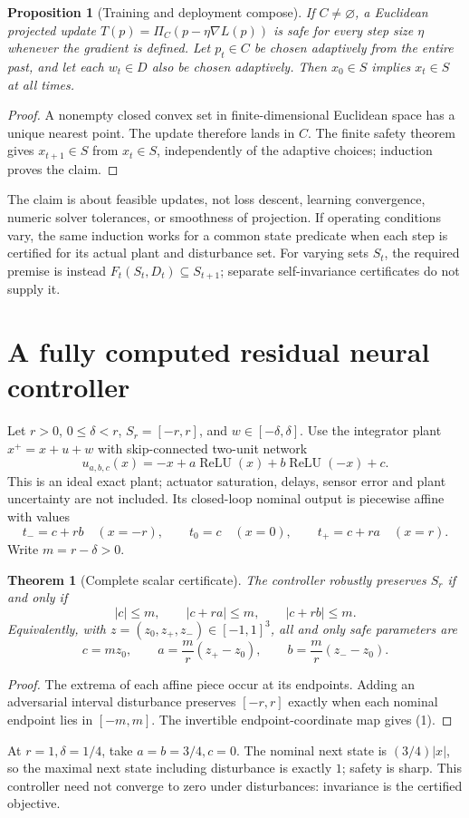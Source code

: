 \documentclass[11pt]{article}
\newtheorem{theorem}{Theorem}\newtheorem{proposition}{Proposition}
\begin{document}
\begin{proposition}[Training and deployment compose]
If $C\ne\varnothing$, a Euclidean projected update
$T(p)=\Pi_C(p-\eta\nabla L(p))$ is safe for every step size $\eta$ whenever the gradient is defined. Let $p_t\in C$ be chosen adaptively from the entire past, and let each $w_t\in D$ also be chosen adaptively. Then $x_0\in S$ implies $x_t\in S$ at all times.
\end{proposition}
\begin{proof}
A nonempty closed convex set in finite-dimensional Euclidean space has a unique nearest point. The update therefore lands in $C$. The finite safety theorem gives $x_{t+1}\in S$ from $x_t\in S$, independently of the adaptive choices; induction proves the claim.
\end{proof}
The claim is about feasible updates, not loss descent, learning convergence, numeric solver tolerances, or smoothness of projection. If operating conditions vary, the same induction works for a common state predicate when each step is certified for its actual plant and disturbance set. For varying sets $S_t$, the required premise is instead $F_t(S_t,D_t)\subseteq S_{t+1}$; separate self-invariance certificates do not supply it.

\section{A fully computed residual neural controller}
Let $r>0$, $0\le\delta<r$, $S_r=[-r,r]$, and $w\in[-\delta,\delta]$. Use the integrator plant $x^+=x+u+w$ with skip-connected two-unit network
\[
 u_{a,b,c}(x)=-x+a\operatorname{ReLU}(x)+b\operatorname{ReLU}(-x)+c.
\]
This is an ideal exact plant; actuator saturation, delays, sensor error and plant uncertainty are not included. Its closed-loop nominal output is piecewise affine with values
\[
 t_- =c+rb\quad(x=-r),\qquad t_0=c\quad(x=0),\qquad t_+=c+ra\quad(x=r).
\]
Write $m=r-\delta>0$.
\begin{theorem}[Complete scalar certificate]
The controller robustly preserves $S_r$ if and only if
\[
 |c|\le m,\qquad |c+ra|\le m,\qquad |c+rb|\le m.
\]
Equivalently, with $z=(z_0,z_+,z_-)\in[-1,1]^3$, all and only safe parameters are
\[
 c=mz_0,\qquad a=\frac m r(z_+-z_0),\qquad b=\frac m r(z_--z_0).
\tag{1}
\]
\end{theorem}
\begin{proof}
The extrema of each affine piece occur at its endpoints. Adding an adversarial interval disturbance preserves $[-r,r]$ exactly when each nominal endpoint lies in $[-m,m]$. The invertible endpoint-coordinate map gives (1).
\end{proof}
At $r=1,\delta=1/4$, take $a=b=3/4,c=0$. The nominal next state is $(3/4)|x|$, so the maximal next state including disturbance is exactly $1$; safety is sharp. This controller need not converge to zero under disturbances: invariance is the certified objective.
\end{document}
